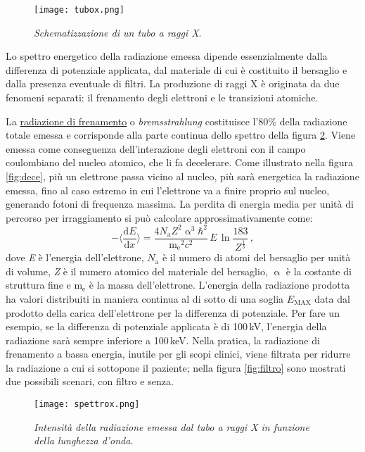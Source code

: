 \documentclass{report}
\newcommand{\figref}[1]{figura \ref{#1}}
\numberwithin{equation}{section}
\numberwithin{figure}{section}
\begin{document}
\begin{figure}[htp]
\centering
\texttt{[image: tubox.png]}
\caption{\label{fig:tubox} \textit{Schematizzazione di un tubo a raggi X}.}
\end{figure}

Lo spettro energetico della radiazione emessa dipende essenzialmente dalla differenza di potenziale applicata, dal materiale di cui è costituito il bersaglio e dalla presenza eventuale di filtri. La produzione di raggi X è originata da due fenomeni separati: il frenamento degli elettroni e le transizioni atomiche.

La \underline{radiazione di frenamento} o \textit{bremsstrahlung} costituisce l'80\% della radiazione totale emessa e corrisponde alla parte continua dello spettro della \figref{fig:spettrox}. Viene emessa come conseguenza dell'interazione degli elettroni con il campo coulombiano del nucleo atomico, che li fa decelerare. Come illustrato nella \figref{fig:dece}, più un elettrone passa vicino al nucleo, più sarà energetica la radiazione emessa, fino al caso estremo in cui l'elettrone va a finire proprio sul nucleo, generando fotoni di frequenza massima. La perdita di energia media per unità di percorso per irraggiamento si può calcolare approssimativamente come:
\begin{equation}
    - \Big\langle \frac{\mathrm{d}E}{\mathrm{d}x} \Big\rangle = \dfrac{4N_\mathrm{a} Z^2 \upalpha^3 \hbar^2}{\mathrm{m_e}^2 c^2}\,E\,\ln{\frac{183}{Z^{\frac{1}{3}}}}\,,
\end{equation}
dove \textit{E} è l'energia dell'elettrone, $N_\mathrm{a}$ è il numero di atomi del bersaglio per unità di volume, \textit{Z} è il numero atomico del materiale del bersaglio, $\upalpha$ è la costante di struttura fine e $\mathrm{m_e}$ è la massa dell'elettrone. L'energia della radiazione prodotta ha valori distribuiti in maniera continua al di sotto di una soglia $E_\mathrm{MAX}$ data dal prodotto della carica dell'elettrone per la differenza di potenziale. Per fare un esempio, se la differenza di potenziale applicata è di 100\,kV, l'energia della radiazione sarà sempre inferiore a 100\,keV. Nella pratica, la radiazione di frenamento a bassa energia, inutile per gli scopi clinici, viene filtrata per ridurre la radiazione a cui si sottopone il paziente; nella \figref{fig:filtro} sono mostrati due possibili scenari, con filtro e senza.

\begin{figure}[htp]
\centering
\texttt{[image: spettrox.png]}
\caption{\label{fig:spettrox} \textit{Intensità della radiazione emessa dal tubo a raggi X in funzione della lunghezza d'onda}.}
\end{figure}
\end{document}
